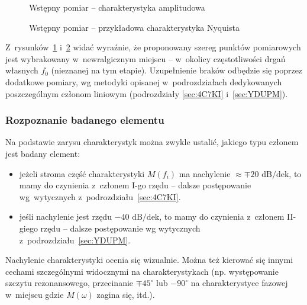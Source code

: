 \documentclass[paper=a4,DIV=12]{lpas}
\newcommand{\degree}{^{\circ}}
\begin{document}
\begin{appendices}
  \begin{figure}[H]
    \centering
    
    \caption{Wstępny pomiar -- charakterystyka amplitudowa}
    \label{fig:KSU5J}
  \end{figure}

  \begin{figure}[H]
    \centering
    
    \caption{Wstępny pomiar -- przykładowa charakterystyka Nyquista}
    \label{fig:KRYUF}
  \end{figure}

  Z~rysunków~\ref{fig:KSU5J} i~\ref{fig:KRYUF} widać wyraźnie, że proponowany
  szereg punktów pomiarowych jest wybrakowany w~newralgicznym miejscu --
  w~okolicy częstotliwości drgań własnych $f_0$ (nieznanej na tym etapie).
  Uzupełnienie braków odbędzie się poprzez dodatkowe pomiary, wg metodyki
  opisanej w~podrozdziałach dedykowanych poszczególnym członom liniowym
  (podrozdziały \ref{sec:4C7KI} i~\ref{sec:YDUPM}).

  \subsubsection{Rozpoznanie badanego elementu}
  \label{sec:AP5MQ}

  Na podstawie zarysu charakterystyk można zwykle ustalić, jakiego typu członem
  jest badany element:
  \begin{itemize}
    \item jeżeli stroma część charakterystyki $M(f_i)$ ma nachylenie $\approx \mp
      20\text{ dB/dek}$, to mamy do czynienia z~członem I-go rzędu -- dalsze
      postępowanie wg~wytycznych z~podrozdziału~\ref{sec:4C7KI}.
    \item jeśli nachylenie jest rzędu $-40\text{ dB/dek}$, to mamy do czynienia
      z~członem II-giego rzędu -- dalsze postępowanie wg wytycznych
      z~podrozdziału~\ref{sec:YDUPM}.
  \end{itemize}
  Nachylenie charakterystyki ocenia się wizualnie. Można też kierować się
  innymi cechami szczególnymi widocznymi na charakterystykach (np. występowanie
  szczytu rezonansowego, przecinanie $\mp 45\degree$ lub $-90\degree$ na
  charakterystyce fazowej w~miejscu gdzie $M(\omega)$ zagina się, itd.).


\end{appendices}
\end{document}
